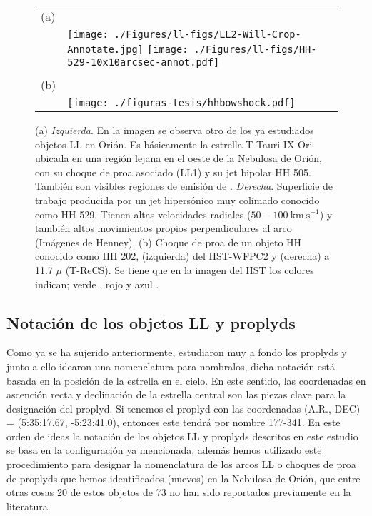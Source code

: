 \begin{figure}[htp]
\centering
\begin{tabular}{l l}
(a) & \\
 & \texttt{[image: ./Figures/ll-figs/LL2-Will-Crop-Annotate.jpg]}
\texttt{[image: ./Figures/ll-figs/HH-529-10x10arcsec-annot.pdf]}
\\
& \\[2\baselineskip]
(b) & \\
& \texttt{[image: ./figuras-tesis/hhbowshock.pdf]}
\\
\end{tabular}
\caption{(a) \textit{Izquierda}. En la imagen se observa otro de los ya estudiados objetos LL en Orión. Es básicamente la estrella T-Tauri IX Ori ubicada en una región lejana en el oeste de la Nebulosa de Orión, con su choque de proa asociado (LL1) y su jet bipolar HH 505. También son visibles regiones de emisión de \oiii{}. \textit{Derecha}. Superficie de trabajo producida por un jet hipersónico muy colimado conocido como HH 529. Tienen altas velocidades radiales (\(50-100 ~\text{km}~\text{s}^{-1}\)) y también altos  movimientos propios perpendiculares al arco (Imágenes de Henney). (b) Choque de proa de un objeto HH conocido como HH 202, (izquierda) del HST-WFPC2 y (derecha) a 11.7 \(\mu\) (T-ReCS). Se tiene que en la imagen del HST los colores indican; verde \ha{}, rojo \nii{} y azul \oiii{} \citep{Smith:2005}.}\label{fig:objecthh}
\end{figure}

\subsection{Notación de los objetos LL y proplyds}
\label{sec:notacion}

Como ya se ha sujerido anteriormente, \citet{Odell:1994} estudiaron muy a fondo los proplyds y junto a  ello idearon una nomenclatura para nombralos, dicha notación está basada en la posición de la estrella en el cielo. En este sentido, las coordenadas en ascención recta y declinación de la estrella central son las piezas clave para la designación del proplyd. Si tenemos el proplyd con las coordenadas (A.R., DEC) = (5:35:17.67, -5:23:41.0), entonces este tendrá por nombre 177-341. En este orden de ideas la notación de los objetos LL y proplyds descritos en este estudio se basa en la configuración ya mencionada, además hemos utilizado este procedimiento para designar la nomenclatura de los arcos LL o choques de proa de proplyds que hemos identificados (nuevos) en la Nebulosa de Orión, que entre otras cosas 20 de estos objetos de 73 no han sido reportados previamente en la literatura.

